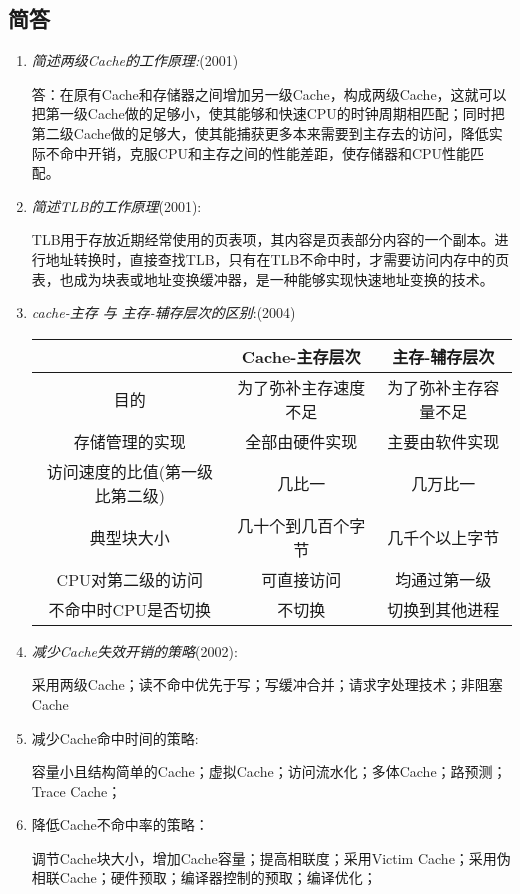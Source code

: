 \documentclass[a4paper]{ctexart}
\begin{document}
\subsection{简答}
\begin{enumerate}
  \item \emph{简述两级Cache的工作原理:}(2001)
  
  答：在原有Cache和存储器之间增加另一级Cache，构成两级Cache，这就可以把第一级Cache做的足够小，使其能够和快速CPU的时钟周期相匹配；同时把第二级Cache做的足够大，使其能捕获更多本来需要到主存去的访问，降低实际不命中开销，克服CPU和主存之间的性能差距，使存储器和CPU性能匹配。

  \item \emph{简述TLB的工作原理}(2001):
  
  TLB用于存放近期经常使用的页表项，其内容是页表部分内容的一个副本。进行地址转换时，直接查找TLB，只有在TLB不命中时，才需要访问内存中的页表，也成为块表或地址变换缓冲器，是一种能够实现快速地址变换的技术。
  
  \item \emph{cache-主存 与 主存-辅存层次的区别}:(2004)
  \begin{table}[!htbp]
    \centering
    \begin{tabular}{c|c|c}
      \hline
      &Cache-主存层次&主存-辅存层次 \\
      \hline  
      目的&为了弥补主存速度不足&为了弥补主存容量不足\\
      \hline
      存储管理的实现&全部由硬件实现&主要由软件实现\\
      \hline
      访问速度的比值(第一级比第二级)&几比一&几万比一\\
      \hline
      典型块大小&几十个到几百个字节&几千个以上字节\\
      \hline
      CPU对第二级的访问&可直接访问&均通过第一级\\
      \hline
      不命中时CPU是否切换&不切换&切换到其他进程\\
      \hline
    \end{tabular}  
  \end{table}
  
        
  \item \emph{减少Cache失效开销的策略}(2002):

  采用两级Cache；读不命中优先于写；写缓冲合并；请求字处理技术；非阻塞Cache
  \item 减少Cache命中时间的策略:
  
  容量小且结构简单的Cache；虚拟Cache；访问流水化；多体Cache；路预测；Trace Cache；
  \item 降低Cache不命中率的策略：
  
  调节Cache块大小，增加Cache容量；提高相联度；采用Victim Cache；采用伪相联Cache；硬件预取；编译器控制的预取；编译优化；
\end{enumerate}
\end{document}
